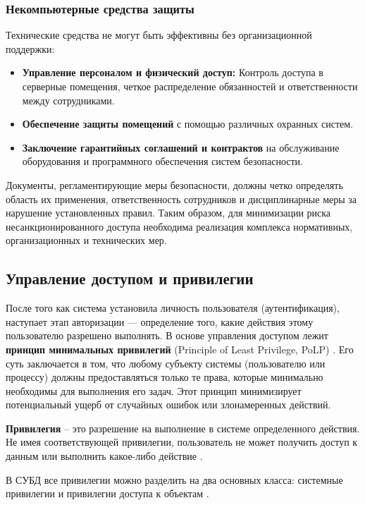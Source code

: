 \subsubsection{Некомпьютерные средства защиты}
Технические средства не могут быть эффективны без организационной поддержки:
\begin{itemize}
	\item \textbf{Управление персоналом и физический доступ:} Контроль доступа в серверные помещения, четкое распределение обязанностей и ответственности между сотрудниками.
	\item \textbf{Обеспечение защиты помещений} с помощью различных охранных систем.
	\item \textbf{Заключение гарантийных соглашений и контрактов} на обслуживание оборудования и программного обеспечения систем безопасности.
\end{itemize}
Документы, регламентирующие меры безопасности, должны четко определять область их применения, ответственность сотрудников и дисциплинарные меры за нарушение установленных правил. Таким образом, для минимизации риска несанкционированного доступа необходима реализация комплекса нормативных, организационных и технических мер.

\subsection{Управление доступом и привилегии}
После того как система установила личность пользователя (аутентификация), наступает этап авторизации — определение того, какие действия этому пользователю разрешено выполнять. В основе управления доступом лежит \textbf{принцип минимальных привилегий} (Principle of Least Privilege, PoLP) \autocite{oracledbdoc3}. Его суть заключается в том, что любому субъекту системы (пользователю или процессу) должны предоставляться только те права, которые минимально необходимы для выполнения его задач. Этот принцип минимизирует потенциальный ущерб от случайных ошибок или злонамеренных действий.

\begin{grayquote}
	\textbf{Привилегия} – это разрешение на выполнение в системе определенного действия. Не имея соответствующей привилегии, пользователь не может получить доступ к данным или выполнить какое-либо действие \autocite{Smirnov2007}.
\end{grayquote}

В СУБД все привилегии можно разделить на два основных класса: системные привилегии и привилегии доступа к объектам \autocite{MicrosoftLearnSQLserverPerm}.

